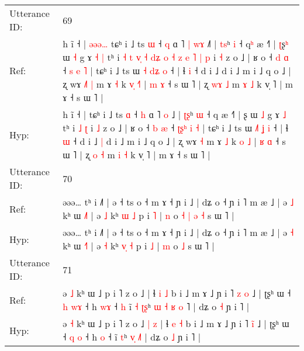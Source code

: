 \documentclass[10pt]{article}
\DeclareRobustCommand{\hl}[1]{{\textcolor{red}{#1}}}
\begin{document}
\begin{longtable}{ll}
 \\
\midrule
Utterance ID: & 69 \\
Ref: & h ĩ ˧ |\hl{ }\hl{ə}\hl{ə}\hl{ə}\hl{…} tɕʰ i ˩ ts \hl{ɯ} ˧ \hl{q} ɑ ˥\hl{ }\hl{|} \hl{w}\hl{ɤ} ˩\hl{˥} | \hl{t}\hl{s}ʰ \hl{i} ˧ q\hl{ʰ} æ ˧˥ | \hl{ʈ}ʂ\hl{ʰ} ɯ \hl{˧} g ɤ\hl{ }\hl{˧} \hl{|} tʰ i\hl{ }\hl{˧}\hl{ }\hl{t}\hl{ }\hl{v}\hl{̩}\hl{ }\hl{˧}\hl{ }\hl{d}\hl{ʑ}\hl{ }\hl{o}\hl{ }\hl{˧}\hl{ }\hl{z}\hl{ }\hl{e}\hl{ }\hl{˥} \hl{|} \hl{p} i \hl{˧} z o ˩ | ʁ o ˧ \hl{d} \hl{ɑ} ˧ \hl{}\hl{}\hl{s} \hl{e} \hl{˥} | tɕʰ i ˩ ts ɯ \hl{˧}\hl{ }\hl{d}\hl{ʑ} \hl{o} ˧ | ɬ \hl{i} ˧ d i ˩\hl{}\hl{} d i ˩ m i ˩ q o ˩ | ʐ wɤ\hl{ }\hl{˩}\hl{˥} \hl{|} m ɤ \hl{˧} k \hl{v}\hl{̩} \hl{˧}\hl{˥} | \hl{m} \hl{ɤ} ˧ s ɯ ˥ | ʐ \hl{w}\hl{ɤ} \hl{˩} m \hl{ɤ} \hl{˩} k v̩ ˥ | m ɤ ˧ s ɯ ˥ |
 \\
Hyp: & h ĩ ˧ |\hl{}\hl{}\hl{}\hl{}\hl{} tɕʰ i ˩ ts \hl{ɑ} ˧ \hl{h} ɑ ˥\hl{}\hl{} \hl{}\hl{o} ˩\hl{} | \hl{ʈ}\hl{ʂ}ʰ \hl{ɯ} ˧ q\hl{} æ ˧˥ | \hl{}ʂ\hl{} ɯ \hl{˩} g ɤ\hl{}\hl{} \hl{˩} tʰ i\hl{}\hl{}\hl{}\hl{}\hl{}\hl{}\hl{}\hl{}\hl{}\hl{}\hl{}\hl{}\hl{}\hl{}\hl{}\hl{}\hl{}\hl{}\hl{}\hl{}\hl{}\hl{} \hl{˩} \hl{ʈ} i \hl{˩} z o ˩ | ʁ o ˧ \hl{b} \hl{æ} ˧ \hl{ʈ}\hl{ʂ}\hl{ʰ} \hl{i} \hl{˧} | tɕʰ i ˩ ts ɯ \hl{˩}\hl{˥}\hl{ }\hl{ʝ} \hl{i} ˧ | ɬ \hl{ɯ} ˧ d i ˩\hl{ }\hl{|} d i ˩ m i ˩ q o ˩ | ʐ wɤ\hl{}\hl{}\hl{} \hl{˧} m ɤ \hl{˩} k \hl{}\hl{o} \hl{}\hl{˩} | \hl{ʁ} \hl{ɑ} ˧ s ɯ ˥ | ʐ \hl{}\hl{o} \hl{˧} m \hl{i} \hl{˧} k v̩ ˥ | m ɤ ˧ s ɯ ˥ |
 \\
\midrule
Utterance ID: & 70 \\
Ref: & əəə… tʰ i ˩˥ | ə ˧ ts o ˧ m ɤ ˧ ɲ i ˩ | dʑ o ˧ ɲ i ˥ m æ ˩ | ə \hl{˩} kʰ ɯ \hl{˩}˥ | ə \hl{˩} kʰ \hl{}\hl{ɯ} \hl{˩} p i \hl{˥} | \hl{n} o\hl{ }\hl{˧}\hl{ }\hl{|}\hl{ }\hl{ə} \hl{˧} s ɯ ˥ |
 \\
Hyp: & əəə… tʰ i ˩˥ | ə ˧ ts o ˧ m ɤ ˧ ɲ i ˩ | dʑ o ˧ ɲ i ˥ m æ ˩ | ə \hl{˧} kʰ ɯ \hl{˧}˥ | ə \hl{˧} kʰ \hl{v}\hl{̩} \hl{˧} p i \hl{˩} | \hl{m} o\hl{}\hl{}\hl{}\hl{}\hl{}\hl{} \hl{˩} s ɯ ˥ |
 \\
\midrule
Utterance ID: & 71 \\
Ref: & ə \hl{˩} kʰ ɯ ˩ p i ˥ z o ˩\hl{}\hl{}\hl{}\hl{} | ɬ \hl{i} \hl{˩} b i ˩ m ɤ ˩ ɲ i ˥ \hl{z}\hl{ }\hl{o} ˩ | ʈʂʰ ɯ ˧ \hl{h} \hl{w}\hl{ɤ} ˧ h \hl{w}\hl{ɤ} ˧\hl{ }\hl{h} ĩ\hl{ }\hl{˧} \hl{ʈ}\hl{ʂ}ʰ\hl{ }\hl{ɯ} \hl{˧}\hl{ }\hl{ʁ} \hl{o}\hl{ }˥ | dʑ o \hl{˧} ɲ i ˥ |
 \\
Hyp: & ə \hl{˧} kʰ ɯ ˩ p i ˥ z o ˩\hl{ }\hl{|}\hl{ }\hl{z} | ɬ \hl{e} \hl{˧} b i ˩ m ɤ ˩ ɲ i ˥ \hl{}\hl{i}\hl{̃} ˩ | ʈʂʰ ɯ ˧ \hl{q} \hl{}\hl{o} ˧ h \hl{}\hl{o} ˧\hl{}\hl{} ĩ\hl{}\hl{} \hl{}\hl{t}ʰ\hl{}\hl{} \hl{}\hl{v}\hl{̩} \hl{}\hl{˩}˥ | dʑ o \hl{˩} ɲ i ˥ |

\end{longtable}
\end{document}
